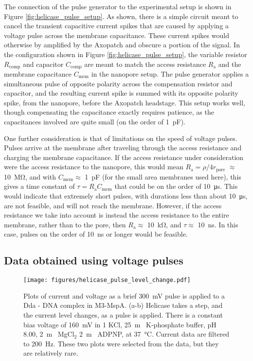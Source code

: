 The connection of the pulse generator to the experimental setup is shown in Figure \ref{fig:helicase_pulse_setup}.  As shown, there is a simple circuit meant to cancel the transient capacitive current spikes that are caused by applying a voltage pulse across the membrane capacitance.  These current spikes would otherwise by amplified by the Axopatch and obscure a portion of the signal.  In the configuration shown in Figure \ref{fig:helicase_pulse_setup}, the variable resistor $R_{\text{comp}}$ and capacitor $C_{\text{comp}}$ are meant to match the access resistance $R_{\text{a}}$ and the membrane capacitance $C_{\text{mem}}$ in the nanopore setup.  The pulse generator applies a simultaneous pulse of opposite polarity across the compensation resistor and capacitor, and the resulting current spike is summed with its opposite polarity spike, from the nanopore, before the Axopatch headstage.  This setup works well, though compensating the capacitance exactly requires patience, as the capacitances involved are quite small (on the order of \SI{1}{\pico\F}).

One further consideration is that of limitations on the speed of voltage pulses.  Pulses arrive at the membrane after traveling through the access resistance and charging the membrane capacitance.  If the access resistance under consideration were the access resistance to the nanopore, this would mean $R_{\text{a}} = \rho / 4 r_{\text{pore}}$ \citep{Hall1975} $ \approx $ \SI{10}{\mega\ohm}, and with $C_{\text{mem}} \approx $ \SI{1}{\pico\F} (for the small area membranes used here), this gives a time constant of $\tau = R_{\text{a}} C_{\text{mem}}$ that could be on the order of \SI{10}{\micro\s}.  This would indicate that extremely short pulses, with durations less than about \SI{10}{\micro\s}, are not feasible, and will not reach the membrane.  However, if the access resistance we take into account is instead the access resistance to the entire membrane, rather than to the pore, then $R_{\text{a}} \approx $ \SI{10}{\kilo\ohm}, and $\tau \approx $ \SI{10}{\ns}.  In this case, pulses on the order of \SI{10}{\ns} or longer would be feasible.

\subsection{Data obtained using voltage pulses}

\begin{figure}[h]
\begin{centering}
\texttt{[image: figures/helicase\_pulse\_level\_change.pdf]}
\caption[Voltage pulse can induce a helicase step]{Plots of current and voltage as a brief \SI{300}{\mV} pulse is applied to a Dda - DNA complex in  M3-MspA.  (a-b) Helicase takes a step, and the current level changes, as a pulse is applied.  There is a constant bias voltage of \SI{160}{\mV} in \SI{1}{\Molar} KCl, \SI{25}{\m\Molar} K-phosphate buffer, pH \num{8.00}, \SI{2}{\m\Molar} MgCl$_2$ \SI{2}{\m\Molar} ADPNP, at \SI{37}{\celsius}.  Current data are filtered to \SI{200}{\Hz}.  These two plots were selected from the data, but they are relatively rare.}
\label{fig:helicase_pulse}
\end{centering}
\end{figure}

